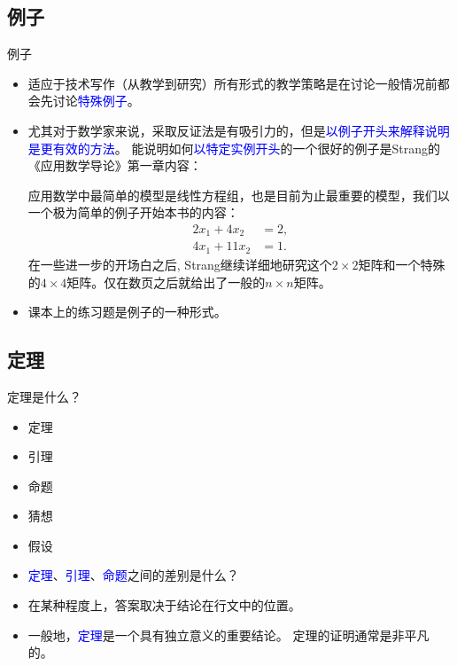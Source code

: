 \documentclass[13pt]{ctexbeamer}
\newcommand{\blue}[1]{\textcolor{blue}{#1}}
\begin{document}
\subsection{例子}

\begin{frame}{例子}
	\begin{itemize}
		\item
		适应于技术写作（从教学到研究）所有形式的教学策略是在讨论一般情况前都会先讨论\blue{特殊例子}。
		\item
		尤其对于数学家来说，采取反证法是有吸引力的，但是\blue{以例子开头来解释说明是更有效的方法}。
		能说明如何\blue{以特定实例开头}的一个很好的例子是Strang的《应用数学导论》第一章内容：

		{\small
			应用数学中最简单的模型是线性方程组，也是目前为止最重要的模型，我们以一个极为简单的例子开始本书的内容：
			\begin{align*}
				2 x_1+ 4 x_2& =2,\\
				4 x_1 +11x_2 & =1.
			\end{align*}
			在一些进一步的开场白之后, Strang继续详细地研究这个$2\times 2$矩阵和一个特殊的$4\times 4$矩阵。仅在数页之后就给出了一般的$n \times n$矩阵。}

		\item 课本上的\alert{练习题}是例子的一种形式。
	\end{itemize}


\end{frame}




\subsection{定理}
\begin{frame}{定理是什么？}


\begin{itemize}
	\item 定理
	\item 引理
	\item 命题
	\item 猜想
	\item 假设
\end{itemize}
\end{frame}

\begin{frame}
\begin{itemize}
\item \blue{定理}、\blue{引理}、\blue{命题}之间的差别是什么？
\item 在某种程度上，答案取决于结论在行文中的位置。
\item
一般地，\blue{定理}是一个具有独立意义的重要结论。
定理的证明通常是非平凡的。


\end{itemize}
\end{frame}
\end{document}
